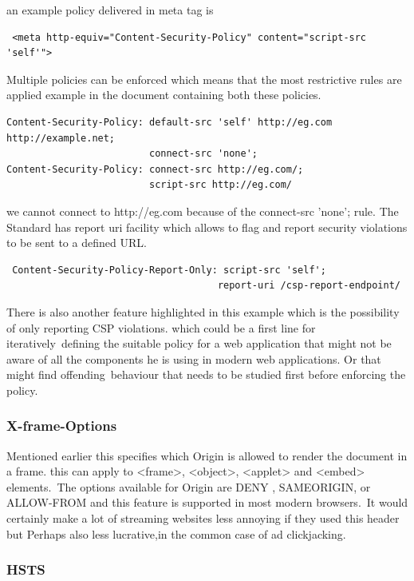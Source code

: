 \documentclass[a4paper,12pt]{paper}
\begin{document}
an example policy delivered in meta tag is 
\begin{verbatim}
 <meta http-equiv="Content-Security-Policy" content="script-src 'self'">
\end{verbatim}

Multiple policies can be enforced which means that the most restrictive rules are applied example in the document containing both these policies.\
\begin{verbatim}
Content-Security-Policy: default-src 'self' http://eg.com http://example.net;
                         connect-src 'none';
Content-Security-Policy: connect-src http://eg.com/;
                         script-src http://eg.com/
\end{verbatim}

we cannot connect to http://eg.com because of the connect-src 'none'; rule.
The Standard has report uri facility which allows to flag and report security violations to be sent to a defined URL.

\begin{verbatim}
 Content-Security-Policy-Report-Only: script-src 'self';
                                     report-uri /csp-report-endpoint/
\end{verbatim}

There is also another feature highlighted in this example which is the possibility of only reporting CSP violations. which could be a first line for iteratively\
defining the suitable policy for a web application that might not be aware of all the components he is using in modern web applications. Or that might find offending\
behaviour that needs to be studied first before enforcing the policy.\\


\subsubsection{X-frame-Options}
\label{X-frame-Options}
Mentioned earlier this specifies which Origin is allowed to render the document in a frame. this can apply to <frame>, <object>, <applet> and <embed> elements.\
The options available for Origin are DENY , SAMEORIGIN, or ALLOW-FROM and this feature is supported in most modern browsers.\
It would certainly make a lot of streaming websites less annoying if they used this header but Perhaps also less lucrative,in the common case of ad clickjacking.\

\subsubsection{HSTS}
\end{document}
